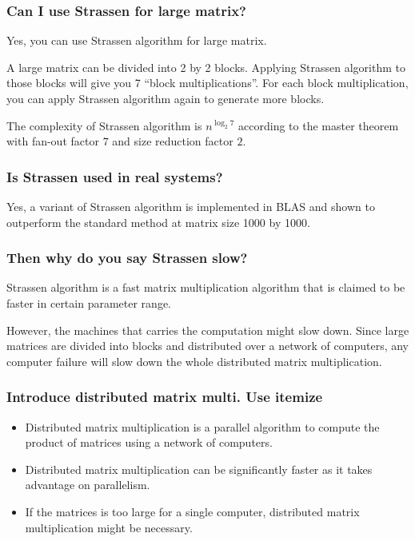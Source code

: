 \documentclass[aspectratio=169, t]{beamer}
\begin{document}
\begin{frame}
	\frametitle{Can I use Strassen for large matrix?}

	Yes, you can use Strassen algorithm for large matrix.

	A large matrix can be divided into 2 by 2 blocks.
	Applying Strassen algorithm to those blocks
	will give you 7 ``block multiplications''.
	For each block multiplication,
	you can apply Strassen algorithm again
	to generate more blocks.

	\pause

	The complexity of Strassen algorithm is $n^{\log_2 7}$
	according to the master theorem with fan-out factor $7$
	and size reduction factor $2$.
\end{frame}

\begin{frame}
	\frametitle{Is Strassen used in real systems?}

	Yes, a variant of Strassen algorithm is implemented in BLAS
	and shown to outperform the standard method at matrix size 1000 by 1000.
\end{frame}

\begin{frame}
	\frametitle{Then why do you say Strassen slow?}

	Strassen algorithm is a fast matrix multiplication algorithm
	that is claimed to be faster in certain parameter range.

	However, the machines that carries the computation might slow down.
	Since large matrices are divided into blocks and distributed
	over a network of computers, any computer failure
	will slow down the whole distributed matrix multiplication.
\end{frame}

\begin{frame}
	\frametitle{Introduce distributed matrix multi.  Use itemize}

	\begin{itemize}
		\item Distributed matrix multiplication is a parallel algorithm
			 to compute the product of matrices using a network of computers.

		\item Distributed matrix multiplication can be significantly faster
			as it takes advantage on parallelism.

		\item If the matrices is too large for a single computer,
			distributed matrix multiplication might be necessary.
	\end{itemize}
\end{frame}
\end{document}
